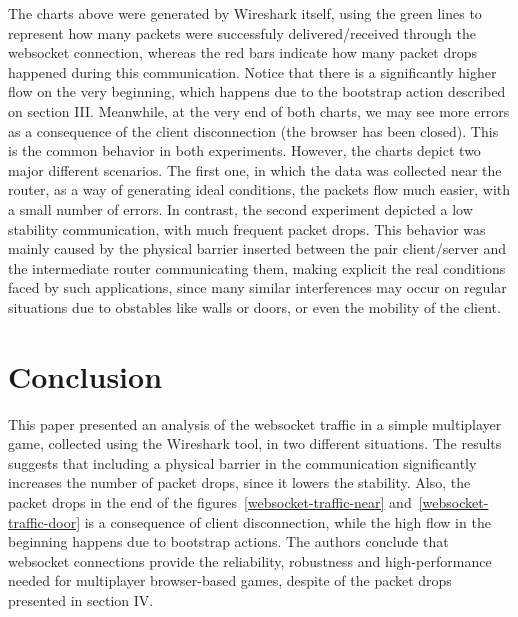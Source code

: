 \documentclass[english]{sbrt}
\begin{document}
The charts above were generated by Wireshark itself, using the green lines to represent
how many packets were successfuly delivered/received through the websocket connection, whereas the
red bars indicate how many packet drops happened during this communication. Notice that there is a significantly
higher flow on the very beginning, which happens due to the bootstrap action described on section III. Meanwhile, at the very end
of both charts, we may see more errors as a consequence of the client disconnection (the browser has been closed). This is the common
behavior in both experiments. However, the charts depict two major different scenarios. The first one, in which the data was collected near
the router, as a way of generating ideal conditions, the packets flow much easier, with a small number of errors. In contrast, the second experiment
depicted a low stability communication, with much frequent packet drops. This behavior was mainly caused by the physical barrier inserted between the pair client/server
and the intermediate router communicating them, making explicit the real conditions faced by such applications, since many similar interferences may occur on regular situations
due to obstables like walls or doors, or even the mobility of the client.

\section{\textbf{Conclusion}}
This paper presented an analysis of the websocket traffic in a simple multiplayer game, collected using the Wireshark tool, in two different situations. The results suggests that including a physical barrier in the communication significantly increases the number of packet drops, since it lowers the stability. Also, the packet drops in the end of the figures~\ref{websocket-traffic-near} and~\ref{websocket-traffic-door} is a consequence of client disconnection, while the high flow in the beginning happens due to bootstrap actions. The authors conclude that websocket connections provide the reliability, robustness and high-performance needed for multiplayer browser-based games, despite of the packet drops presented in section IV.

\cite{chen2011framework}



\end{document}
